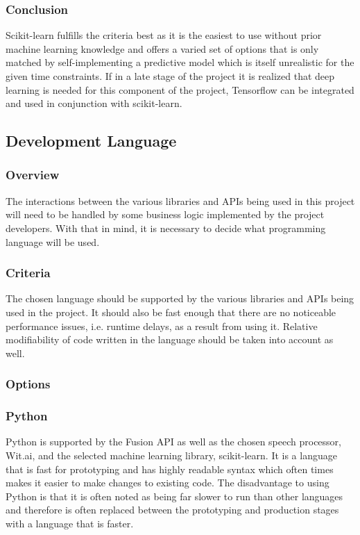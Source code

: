 \documentclass[onecolumn, draftclsnofoot,10pt, compsoc]{IEEEtran}
\begin{document}
	\subsubsection{Conclusion}
	Scikit-learn fulfills the criteria best as it is the easiest to use without prior machine learning knowledge and offers a varied set of options that is only matched by self-implementing a predictive model which is itself unrealistic for the given time constraints.
	If in a late stage of the project it is realized that deep learning is needed for this component of the project, Tensorflow can be integrated and used in conjunction with scikit-learn.

	\subsection{Development Language}
	\subsubsection{Overview}
	The interactions between the various libraries and APIs being used in this project will need to be handled by some business logic implemented by the project developers.
	With that in mind, it is necessary to decide what programming language will be used.
	\subsubsection{Criteria}
	The chosen language should be supported by the various libraries and APIs being used in the project.
	It should also be fast enough that there are no noticeable performance issues, i.e. runtime delays, as a result from using it.
	Relative modifiability of code written in the language should be taken into account as well.
	\subsubsection{Options}
	\subsubsection{Python}
	Python is supported by the Fusion API as well as the chosen speech processor, Wit.ai, and the selected machine learning library, scikit-learn.
	It is a language that is fast for prototyping and has highly readable syntax which often times makes it easier to make changes to existing code.
	The disadvantage to using Python is that it is often noted as being far slower to run than other languages\cite{PyCppSpeedBenchmarks} and therefore is often replaced between the prototyping and production stages with a language that is faster.
\end{document}
